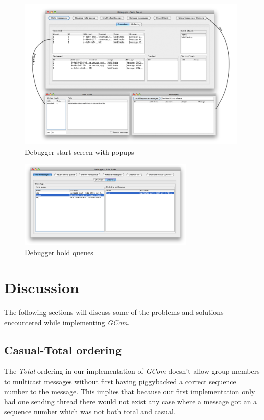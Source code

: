 \documentclass[titlepage, twocolumn, a4paper, 10pt]{article}
\begin{document}
\begin{figure}[!thb]
  \centerline{\includegraphics[width=110mm]{images/Debuggerstart.png}}
  \caption{Debugger start screen with popups}
  \label{fig:images/Debuggerstart}
\end{figure}

\begin{figure}[!thb]
  \centering
  \includegraphics[width=3.3in]{images/Holdqueues.png}
  \caption{Debugger hold queues}
  \label{fig:images/commodule}
\end{figure}


\section{Discussion}\label{sec:discussion}
The following sections will discuss some of the problems and solutions
encountered while implementing \textit{GCom}.

\subsection{Casual-Total ordering}\label{sec:disc-casual-total}
The \textit{Total} ordering in our implementation of \textit{GCom}
doesn't allow group members to multicast messages without first having
piggybacked a correct sequence number to the message. This implies
that because our first implementation only had one sending thread
there would not exist any case where a message got an a sequence
number which was not both total and casual.
\end{document}
